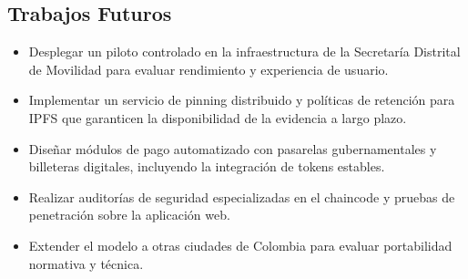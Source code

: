 \subsection*{Trabajos Futuros}
\begin{itemize}
  \item Desplegar un piloto controlado en la infraestructura de la Secretaría Distrital de Movilidad para evaluar rendimiento y experiencia de usuario.
  \item Implementar un servicio de pinning distribuido y políticas de retención para IPFS que garanticen la disponibilidad de la evidencia a largo plazo.
  \item Diseñar módulos de pago automatizado con pasarelas gubernamentales y billeteras digitales, incluyendo la integración de tokens estables.
  \item Realizar auditorías de seguridad especializadas en el chaincode y pruebas de penetración sobre la aplicación web.
  \item Extender el modelo a otras ciudades de Colombia para evaluar portabilidad normativa y técnica.
\end{itemize} 